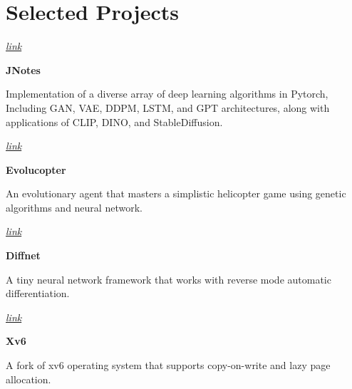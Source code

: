 	\section{Selected Projects}




\begin{twocolentry}{
		
		
		\textit{\href{https://github.com/mehrdad3301/jnotes}{link}}}
	\textbf{JNotes}
\end{twocolentry}

\begin{onecolentry}
	Implementation of a diverse array of deep learning algorithms in Pytorch, Including GAN, VAE, DDPM, LSTM, and GPT architectures, along with applications of CLIP, DINO, and StableDiffusion. 
\end{onecolentry}


\vspace{0.2 cm}

\begin{twocolentry}{
		
		
		\textit{\href{https://github.com/mehrdad3301/EvoluCop}{link}}}
	\textbf{Evolucopter}
\end{twocolentry}

\begin{onecolentry}
	An evolutionary agent that masters a simplistic helicopter game using genetic algorithms and neural network.  
\end{onecolentry}


\vspace{0.2 cm}

\begin{twocolentry}{
		
		\textit{\href{https://github.com/mehrdad3301/diff-Net}{link}}}
	\textbf{Diffnet}
\end{twocolentry}

\begin{onecolentry}
	A tiny neural network framework that works with reverse mode automatic differentiation. 
\end{onecolentry}

\vspace{0.2 cm}

\begin{twocolentry}{
		
		
		\textit{\href{https://github.com/mehrdad3301/xv6}{link}}}
	\textbf{Xv6}
\end{twocolentry}

\begin{onecolentry}
	A fork of xv6 operating system that supports copy-on-write and lazy page allocation.
\end{onecolentry}
\vspace{0.2 cm}

